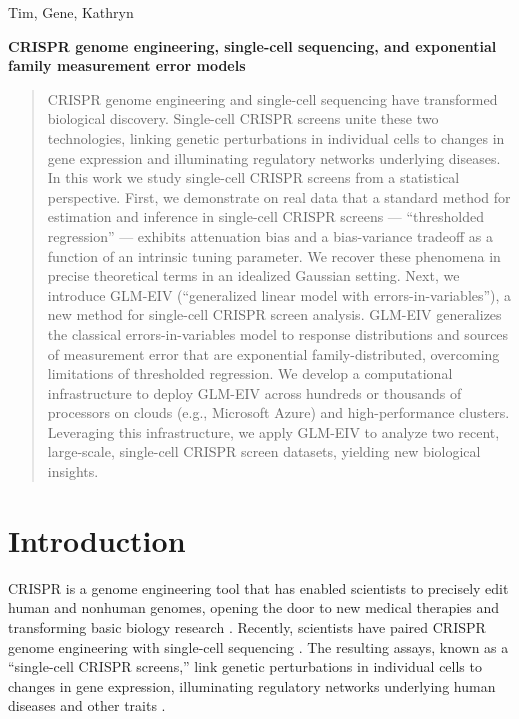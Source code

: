 \documentclass[12pt]{article}
\begin{document}
\noindent
Tim, Gene, Kathryn
\begin{center}
\textbf{CRISPR genome engineering, single-cell sequencing, and exponential family measurement error models}
\end{center}

\begin{abstract}
CRISPR genome engineering and single-cell sequencing have transformed biological discovery. Single-cell CRISPR screens unite these two technologies, linking genetic perturbations in individual cells to changes in gene expression and illuminating regulatory networks underlying diseases. In this work we study single-cell CRISPR screens from a statistical perspective. First, we demonstrate on real data that a standard method for estimation and inference in single-cell CRISPR screens — “thresholded regression” — exhibits attenuation bias and a bias-variance tradeoff as a function of an intrinsic tuning parameter. We recover these phenomena in precise theoretical terms in an idealized Gaussian setting. Next, we introduce GLM-EIV (“generalized linear model with errors-in-variables”), a new method for single-cell CRISPR screen analysis. GLM-EIV generalizes the classical errors-in-variables model to response distributions and sources of measurement error that are exponential family-distributed, overcoming limitations of thresholded regression. We develop a computational infrastructure to deploy GLM-EIV across hundreds or thousands of processors on clouds (e.g., Microsoft Azure) and high-performance clusters. Leveraging this infrastructure, we apply GLM-EIV to analyze two recent, large-scale, single-cell CRISPR screen datasets, yielding new biological insights.
\end{abstract}

\section{Introduction}
CRISPR is a genome engineering tool that has enabled scientists to precisely edit human and nonhuman genomes, opening the door to new medical therapies \cite{Rothgangl2021,Musunuru2021} and transforming basic biology research \cite{Przybyla2021}. Recently, scientists have paired CRISPR genome engineering with single-cell sequencing \cite{Dixit2016,Datlinger2017}. The resulting assays, known as a ``single-cell CRISPR screens,'' link genetic perturbations in individual cells to changes in gene expression, illuminating regulatory networks underlying human diseases and other traits \cite{Morris2021a}.
\end{document}
